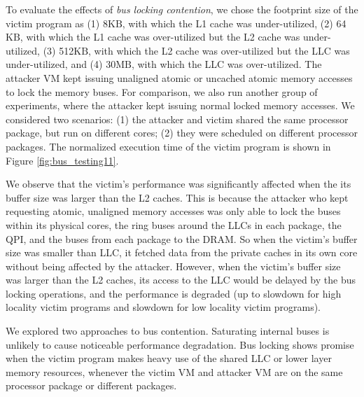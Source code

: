 \documentclass{sig-alternate}
\newcommand{\bheading}[1]{{\vspace{2pt}\noindent{\textbf{#1}}\hspace{2pt}}}
\newcommand{\mbytes}{\ensuremath{\mathrm{MB}}\xspace}
\newcommand{\kbytes}{\ensuremath{\mathrm{KB}}\xspace}
\begin{document}
To evaluate the effects of \emph{bus locking contention}, we 
chose the footprint size of the victim program as (1) 8\kbytes, with which 
the L1 cache was under-utilized, (2) 64\kbytes, with which the 
L1 cache was over-utilized but the L2 cache was under-utilized, 
(3) 512\kbytes, with which the L2 cache was over-utilized but the LLC
was under-utilized, and (4) 30\mbytes, with which the LLC was over-utilized.
The attacker VM kept issuing unaligned atomic or uncached atomic memory accesses 
to lock the memory buses. For comparison, we 
also run another group of experiments, where the attacker kept issuing normal locked memory 
accesses. We considered two scenarios: (1) the attacker and victim
shared the same processor package, but run on different 
cores; (2) they were scheduled on different processor packages. The
normalized execution time of the victim program is shown in Figure
\ref{fig:bus_testing11}.



\begin{figure*}[t]
     \centering
    \caption[The LOF caption]{Performance slowdown due to bus locking contention. We use ``H-\emph{x}" or ``L-\emph{x}" to denote the victim program has high or low memory locality and has a buffer size of \emph{x}.}
    \label{fig:bus_testing11}
\end{figure*}


We observe that the victim's performance was significantly affected when the its buffer 
size was larger than the L2 caches. This is because the attacker who kept requesting atomic,
unaligned memory accesses was only able to lock the buses within its physical cores, the
ring buses around the LLCs in each package, the QPI, and the buses from each
package to the DRAM. So when the victim's buffer size was smaller than
LLC, it fetched data from the private caches in its own core without
being affected by the attacker.
However, when the victim's buffer size was larger than the L2 caches, its access to the LLC
would be delayed by the bus locking operations, and the performance is degraded
(up to  slowdown for high locality victim programs and
 slowdown for low locality victim programs).


\bheading{Takeaways.} We explored two approaches to bus contention.
Saturating internal buses is unlikely to cause noticeable performance
degradation. Bus locking shows promise when the victim program makes
heavy use of the shared LLC or lower layer memory resources, whenever 
the victim VM and attacker VM are on the same processor package or 
different packages.
\end{document}
